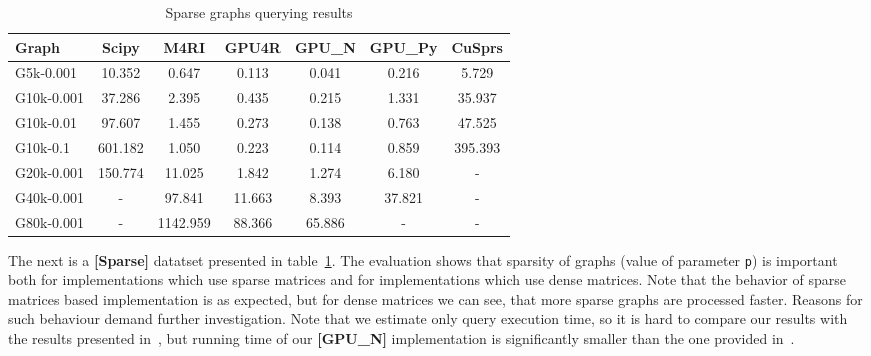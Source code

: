 {\setlength{\tabcolsep}{0.25em}
\begin{table}[H]
\caption{Sparse graphs querying results}
\label{tbl:tableSparse}
\begin{tabular}{| l | c | c | c | c | c | c | }
    \hline
    Graph              & Scipy   & M4RI     & GPU4R  & GPU\_N & GPU\_Py & CuSprs  \\
    \hline
    \hline
    \small{G5k-0.001}  & 10.352  & 0.647    & 0.113  & 0.041  & 0.216   & 5.729   \\
    \small{G10k-0.001} & 37.286  & 2.395    & 0.435  & 0.215  & 1.331   & 35.937  \\
    \small{G10k-0.01}  & 97.607  & 1.455    & 0.273  & 0.138  & 0.763   & 47.525  \\
    \small{G10k-0.1}   & 601.182 & 1.050    & 0.223  & 0.114  & 0.859   & 395.393 \\
    \small{G20k-0.001} & 150.774 & 11.025   & 1.842  & 1.274  & 6.180   & -       \\
    \small{G40k-0.001} & -       & 97.841   & 11.663 & 8.393  & 37.821  & -       \\
    \small{G80k-0.001} & -       & 1142.959 & 88.366 & 65.886 & -       & -       \\
    \hline
  \end{tabular}
\end{table}
}

The next is a \textbf{[Sparse]} datatset presented in table~\ref{tbl:tableSparse}.
The evaluation shows that sparsity of graphs (value of parameter \texttt{p}) is important both for implementations which use sparse matrices and for implementations which use dense matrices.
Note that the behavior of sparse matrices based implementation is as expected, but for dense matrices we can see, that more sparse graphs are processed faster.
Reasons for such behaviour demand further investigation.
Note that we estimate only query execution time, so it is hard to compare our results with the results presented in~\cite{fan2018scaling}, but running time of our \textbf{[GPU\_N]} implementation is significantly smaller than the one provided in~\cite{fan2018scaling}.

